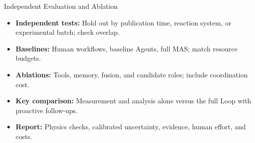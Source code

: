 \setsource{}
\begin{frame}[t,label=md-61]{Independent Evaluation and Ablation}
\small
\begin{itemize}
\setlength{\itemsep}{0.65em}
    \item \textbf{Independent tests:} Hold out by publication time, reaction system, or experimental batch; check overlap.
    \item \textbf{Baselines:} Human workflows, baseline Agents, full MAS; match resource budgets.
    \item \textbf{Ablations:} Tools, memory, fusion, and candidate roles; include coordination cost.
    \item \textbf{Key comparison:} Measurement and analysis alone versus the full Loop with proactive follow-ups.
    \item \textbf{Report:} Physics checks, calibrated uncertainty, evidence, human effort, and costs.
\end{itemize}

\end{frame}

